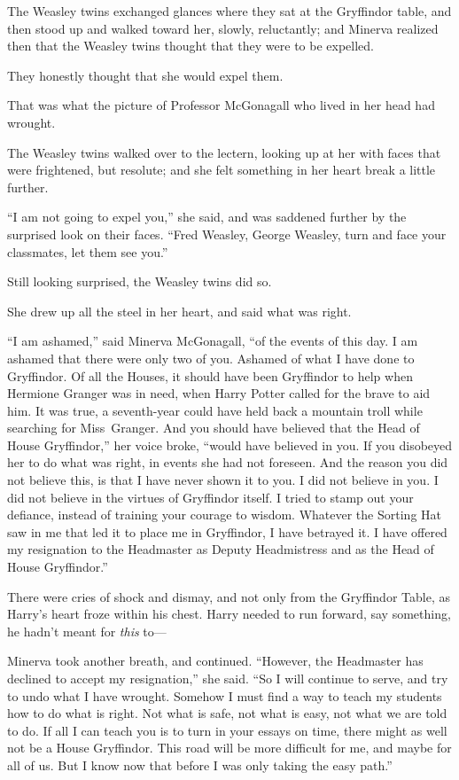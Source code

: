 The Weasley twins exchanged glances where they sat at the Gryffindor table, and then stood up and walked toward her, slowly, reluctantly; and Minerva realized then that the Weasley twins thought that they were to be expelled.

They honestly thought that she would expel them.

That was what the picture of Professor McGonagall who lived in her head had wrought.

The Weasley twins walked over to the lectern, looking up at her with faces that were frightened, but resolute; and she felt something in her heart break a little further.

“I am not going to expel you,” she said, and was saddened further by the surprised look on their faces. “Fred Weasley, George Weasley, turn and face your classmates, let them see you.”

Still looking surprised, the Weasley twins did so.

She drew up all the steel in her heart, and said what was right.

“I am ashamed,” said Minerva McGonagall, “of the events of this day. I am ashamed that there were only two of you. Ashamed of what I have done to Gryffindor. Of all the Houses, it should have been Gryffindor to help when Hermione Granger was in need, when Harry Potter called for the brave to aid him. It was true, a seventh-year could have held back a mountain troll while searching for Miss~Granger. And you should have believed that the Head of House Gryffindor,” her voice broke, “would have believed in you. If you disobeyed her to do what was right, in events she had not foreseen. And the reason you did not believe this, is that I have never shown it to you. I did not believe in you. I did not believe in the virtues of Gryffindor itself. I tried to stamp out your defiance, instead of training your courage to wisdom. Whatever the Sorting Hat saw in me that led it to place me in Gryffindor, I have betrayed it. I have offered my resignation to the Headmaster as Deputy Headmistress and as the Head of House Gryffindor.”

\later

There were cries of shock and dismay, and not only from the Gryffindor Table, as Harry’s heart froze within his chest. Harry needed to run forward, say something, he hadn’t meant for \emph{this} to—

\later

Minerva took another breath, and continued. “However, the Headmaster has declined to accept my resignation,” she said. “So I will continue to serve, and try to undo what I have wrought. Somehow I must find a way to teach my students how to do what is right. Not what is safe, not what is easy, not what we are told to do. If all I can teach you is to turn in your essays on time, there might as well not be a House Gryffindor. This road will be more difficult for me, and maybe for all of us. But I know now that before I was only taking the easy path.”


